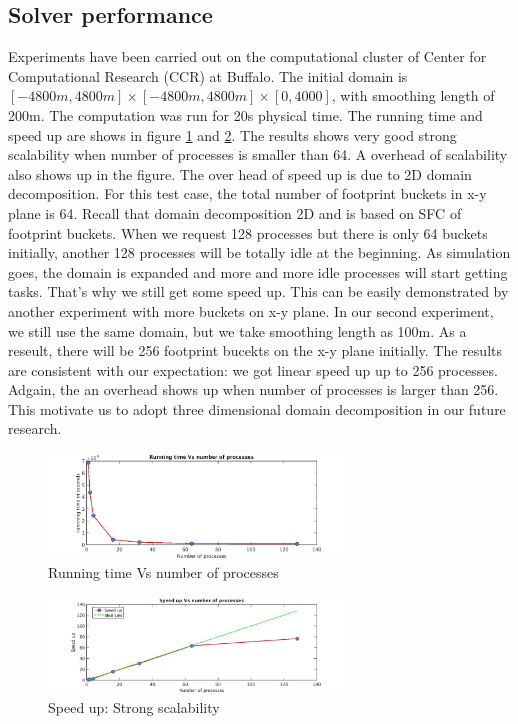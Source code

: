 \documentclass[10pt,a4paper]{article}
\begin{document}
\subsection{Solver performance}
Experiments have been carried out on the computational cluster of Center for Computational Research (CCR) at Buffalo. The initial domain is $[-4800m,4800m]\times [-4800m,4800m] \times [0, 4000]$, with smoothing length of 200m. The computation was run for 20s physical time. The running time and speed up are shows in figure \ref{fig:performance_128_time} and \ref{fig:performance_128_speed_up}. The results shows very good strong scalability when number of processes is smaller than 64. A overhead of scalability also shows up in the figure. The over head of speed up is due to 2D domain decomposition. For this test case, the total number of footprint buckets in x-y plane is 64. Recall that domain decomposition 2D and is based on SFC of footprint buckets. When we request 128 processes but there is only 64 buckets initially, another 128 processes will be totally idle at the beginning. As simulation goes, the domain is expanded and more and more idle processes will start getting tasks. That's why we still get some speed up. This can be easily demonstrated by another experiment with more buckets on x-y plane. In our second experiment, we still use the same domain, but we take smoothing length as 100m. As a reseult, there will be 256 footprint bucekts on the x-y plane initially. The results are consistent with our expectation: we got linear speed up up to 256 processes. Adgain, the an overhead shows up when number of processes is larger than 256. This motivate us to adopt three dimensional domain decomposition in our future research.
\begin{figure}[h]
\caption{Running time Vs number of processes}
\centering
\label{fig:performance_128_time}
\includegraphics[width=0.7\textwidth]{128_time}
\end{figure}
\begin{figure}[h]
\caption{Speed up: Strong scalability}
\centering
\label{fig:performance_128_speed_up}
\includegraphics[width=0.7\textwidth]{128_speed_up}
\end{figure}
\end{document}
